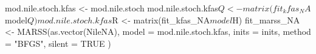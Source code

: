 \begin{Schunk}
\begin{Sinput}
 mod.nile.stoch.kfas <- mod.nile.stoch
 mod.nile.stoch.kfas$Q <- matrix(fit_kfas_NA$model$Q)
 mod.nile.stoch.kfas$R <- matrix(fit_kfas_NA$model$H)
 fit_marss_NA <- MARSS(as.vector(NileNA),
   model = mod.nile.stoch.kfas,
   inits = inits, method = "BFGS", silent = TRUE
 )
\end{Sinput}
\end{Schunk}
